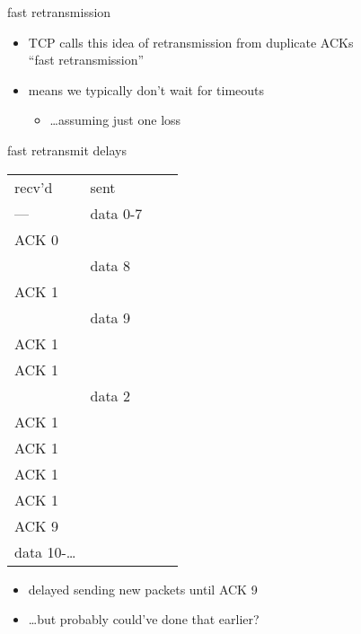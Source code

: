 \begin{frame}{fast retransmission}
    \begin{itemize}
    \item TCP calls this idea of retransmission from duplicate ACKs  \\
        ``fast retransmission''
    \item means we typically don't wait for timeouts
        \begin{itemize}
        \item \ldots assuming just one loss
        \end{itemize}
    \end{itemize}
\end{frame}

\begin{frame}{fast retransmit delays}
\begin{tabular}{llll}
recv'd & sent \\
--- & data 0-7 \\
ACK 0 & ~ \\
~ & data 8 \\
ACK 1 & ~ \\
~ & data 9 \\
ACK 1 & ~  \\
ACK 1 & ~  \\
~ & data 2 \\
ACK 1 & ~ \\
ACK 1 & ~ \\
ACK 1 & ~ \\
ACK 1 & ~ \\
ACK 9 & ~ \\
data 10-\ldots \\
\end{tabular}
\begin{itemize}
\item delayed sending new packets until ACK 9
\item \ldots but probably could've done that earlier?
\end{itemize}
\end{frame}

